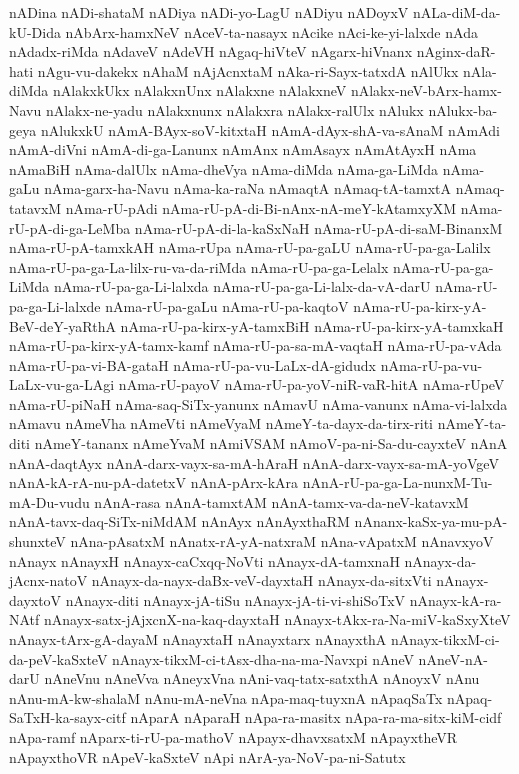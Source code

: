 {nADina
nADi-shataM
nADiya
nADi-yo-LagU
nADiyu
nADoyxV
nALa-diM-da-kU-Dida
nAbArx-hamxNeV
nAceV-ta-nasayx
nAcike
nAci-ke-yi-lalxde
nAda
nAdadx-riMda
nAdaveV
nAdeVH
nAgaq-hiVteV
nAgarx-hiVnanx
nAginx-daR-hati
nAgu-vu-dakekx
nAhaM
nAjAcnxtaM
nAka-ri-Sayx-tatxdA
nAlUkx
nAla-diMda
nAlakxkUkx
nAlakxnUnx
nAlakxne
nAlakxneV
nAlakx-neV-bArx-hamx-Navu
nAlakx-ne-yadu
nAlakxnunx
nAlakxra
nAlakx-ralUlx
nAlukx
nAlukx-ba-geya
nAlukxkU
nAmA-BAyx-soV-kitxtaH
nAmA-dAyx-shA-va-sAnaM
nAmAdi
nAmA-diVni
nAmA-di-ga-Lanunx
nAmAnx
nAmAsayx
nAmAtAyxH
nAma
nAmaBiH
nAma-dalUlx
nAma-dheVya
nAma-diMda
nAma-ga-LiMda
nAma-gaLu
nAma-garx-ha-Navu
nAma-ka-raNa
nAmaqtA
nAmaq-tA-tamxtA
nAmaq-tatavxM
nAma-rU-pAdi
nAma-rU-pA-di-Bi-nAnx-nA-meY-kAtamxyXM
nAma-rU-pA-di-ga-LeMba
nAma-rU-pA-di-la-kaSxNaH
nAma-rU-pA-di-saM-BinanxM
nAma-rU-pA-tamxkAH
nAma-rUpa
nAma-rU-pa-gaLU
nAma-rU-pa-ga-Lalilx
nAma-rU-pa-ga-La-lilx-ru-va-da-riMda
nAma-rU-pa-ga-Lelalx
nAma-rU-pa-ga-LiMda
nAma-rU-pa-ga-Li-lalxda
nAma-rU-pa-ga-Li-lalx-da-vA-darU
nAma-rU-pa-ga-Li-lalxde
nAma-rU-pa-gaLu
nAma-rU-pa-kaqtoV
nAma-rU-pa-kirx-yA-BeV-deY-yaRthA
nAma-rU-pa-kirx-yA-tamxBiH
nAma-rU-pa-kirx-yA-tamxkaH
nAma-rU-pa-kirx-yA-tamx-kamf
nAma-rU-pa-sa-mA-vaqtaH
nAma-rU-pa-vAda
nAma-rU-pa-vi-BA-gataH
nAma-rU-pa-vu-LaLx-dA-gidudx
nAma-rU-pa-vu-LaLx-vu-ga-LAgi
nAma-rU-payoV
nAma-rU-pa-yoV-niR-vaR-hitA
nAma-rUpeV
nAma-rU-piNaH
nAma-saq-SiTx-yanunx
nAmavU
nAma-vanunx
nAma-vi-lalxda
nAmavu
nAmeVha
nAmeVti
nAmeVyaM
nAmeY-ta-dayx-da-tirx-riti
nAmeY-ta-diti
nAmeY-tananx
nAmeYvaM
nAmiVSAM
nAmoV-pa-ni-Sa-du-cayxteV
nAnA
nAnA-daqtAyx
nAnA-darx-vayx-sa-mA-hAraH
nAnA-darx-vayx-sa-mA-yoVgeV
nAnA-kA-rA-nu-pA-datetxV
nAnA-pArx-kAra
nAnA-rU-pa-ga-La-nunxM-Tu-mA-Du-vudu
nAnA-rasa
nAnA-tamxtAM
nAnA-tamx-va-da-neV-katavxM
nAnA-tavx-daq-SiTx-niMdAM
nAnAyx
nAnAyxthaRM
nAnanx-kaSx-ya-mu-pA-shunxteV
nAna-pAsatxM
nAnatx-rA-yA-natxraM
nAna-vApatxM
nAnavxyoV
nAnayx
nAnayxH
nAnayx-caCxqq-NoVti
nAnayx-dA-tamxnaH
nAnayx-da-jAcnx-natoV
nAnayx-da-nayx-daBx-veV-dayxtaH
nAnayx-da-sitxVti
nAnayx-dayxtoV
nAnayx-diti
nAnayx-jA-tiSu
nAnayx-jA-ti-vi-shiSoTxV
nAnayx-kA-ra-NAtf
nAnayx-satx-jAjxcnX-na-kaq-dayxtaH
nAnayx-tAkx-ra-Na-miV-kaSxyXteV
nAnayx-tArx-gA-dayaM
nAnayxtaH
nAnayxtarx
nAnayxthA
nAnayx-tikxM-ci-da-peV-kaSxteV
nAnayx-tikxM-ci-tAsx-dha-na-ma-Navxpi
nAneV
nAneV-nA-darU
nAneVnu
nAneVva
nAneyxVna
nAni-vaq-tatx-satxthA
nAnoyxV
nAnu
nAnu-mA-kw-shalaM
nAnu-mA-neVna
nApa-maq-tuyxnA
nApaqSaTx
nApaq-SaTxH-ka-sayx-citf
nAparA
nAparaH
nApa-ra-masitx
nApa-ra-ma-sitx-kiM-cidf
nApa-ramf
nAparx-ti-rU-pa-mathoV
nApayx-dhavxsatxM
nApayxtheVR
nApayxthoVR
nApeV-kaSxteV
nApi
nArA-ya-NoV-pa-ni-Satutx
}
